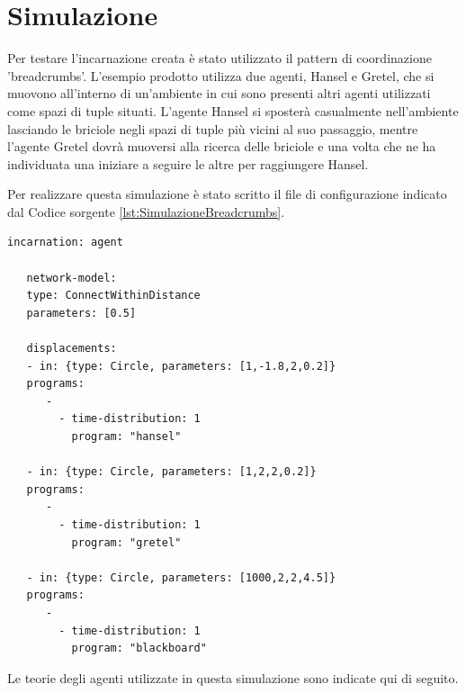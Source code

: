 \documentclass[12pt,a4paper,openright,twoside]{report}
\begin{document}
\section{Simulazione}
Per testare l'incarnazione creata \`e stato utilizzato il pattern di coordinazione 'breadcrumbs'. L'esempio prodotto utilizza due agenti, Hansel e Gretel, che si muovono all'interno di un'ambiente in cui sono presenti altri agenti utilizzati come spazi di tuple situati. L'agente Hansel si sposter\`a casualmente nell'ambiente lasciando le briciole negli spazi di tuple pi\`u vicini al suo passaggio, mentre l'agente Gretel dovr\`a muoversi alla ricerca delle briciole e una volta che ne ha individuata una iniziare a seguire le altre per raggiungere Hansel.

Per realizzare questa simulazione \`e stato scritto il file di configurazione indicato dal Codice sorgente \ref{lst:SimulazioneBreadcrumbs}.
\medskip
\begin{lstlisting}[firstnumber=1,label={lst:SimulazioneBreadcrumbs},caption={Simulazione modello Spatial Tuples con modello di coordinazione breadcrumbs}]
   incarnation: agent

   network-model:
   type: ConnectWithinDistance
   parameters: [0.5]

   displacements:
   - in: {type: Circle, parameters: [1,-1.8,2,0.2]}
   programs:
      -
        - time-distribution: 1
          program: "hansel"

   - in: {type: Circle, parameters: [1,2,2,0.2]}
   programs:
      -
        - time-distribution: 1
          program: "gretel"

   - in: {type: Circle, parameters: [1000,2,2,4.5]}
   programs:
      -
        - time-distribution: 1
          program: "blackboard"
\end{lstlisting}

Le teorie degli agenti utilizzate in questa simulazione sono indicate qui di seguito.
\end{document}
